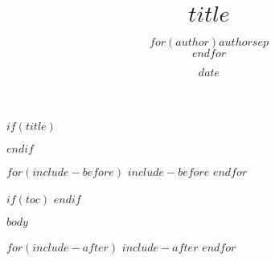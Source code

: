 \documentclass[ebook,article,oneside,english]{memoir}
\title{$title$}
\author{$for(author)$$author$$sep$\\$endfor$}
\date{$date$}
\date{}
\begin{document}
$if(title)$
\maketitle
$endif$ 

$for(include-before)$
$include-before$
$endfor$

$if(toc)$
\tableofcontents
$endif$

$body$

$for(include-after)$
$include-after$
$endfor$
\end{document}
